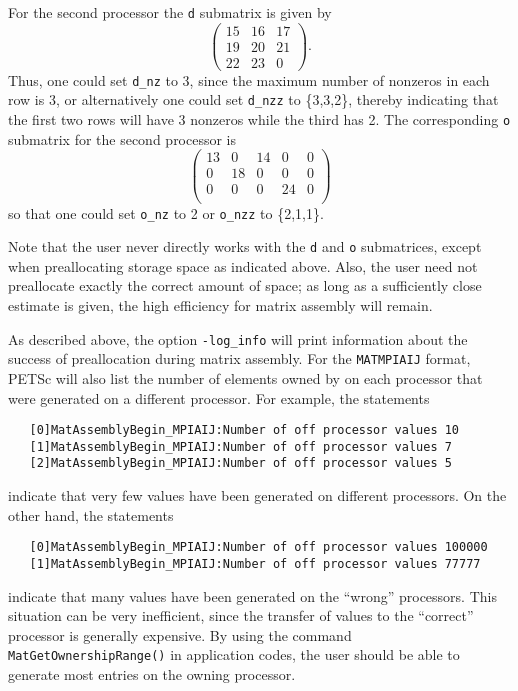 For the second processor the {\tt d} submatrix is given by 
{\small
\[
\left( \begin{array}{cccccccccc} 
 15 & 16 & 17 \\
 19 & 20 & 21 \\
 22 & 23 & 0  
\end{array} \right) .
\]
}
Thus, one could set {\tt d\_nz} to 3, since the maximum number of
nonzeros in each row is 3, or alternatively one could set {\tt d\_nzz} to
\{3,3,2\}, thereby indicating that the first two rows will have 3
nonzeros while the third has 2. The corresponding {\tt o} submatrix for the
second processor is
{\small
\[
\left( \begin{array}{cccccccccc} 
13 & 0  & 14 &  0  & 0  \\
0  & 18 & 0  &  0  & 0 \\
0  & 0  & 0  &  24 & 0 \\
\end{array} \right)
\]
}
so that one could set {\tt o\_nz} to 2 or {\tt o\_nzz} to \{2,1,1\}.

Note that the user never directly works with the {\tt d} and {\tt o}
submatrices, except when preallocating storage space as indicated above.
Also, the user need not preallocate exactly the correct amount of
space; as long as a sufficiently close estimate is given, the high
efficiency for matrix assembly will remain.  

As described above, the option {\tt -log\_info} 
will print information about the success of preallocation during
matrix assembly.  For the {\tt MATMPIAIJ} format, PETSc will also list
the number of elements owned by on each processor that were generated
on a different processor.  For example, the statements
\begin{verbatim}
   [0]MatAssemblyBegin_MPIAIJ:Number of off processor values 10
   [1]MatAssemblyBegin_MPIAIJ:Number of off processor values 7
   [2]MatAssemblyBegin_MPIAIJ:Number of off processor values 5
\end{verbatim}
indicate that very few values have been generated on different processors.
On the other hand, the statements
\begin{verbatim}
   [0]MatAssemblyBegin_MPIAIJ:Number of off processor values 100000
   [1]MatAssemblyBegin_MPIAIJ:Number of off processor values 77777
\end{verbatim}
indicate that many values have been generated on the ``wrong'' processors.
This situation can be very inefficient, since the transfer of values
to the ``correct'' processor is generally expensive.  By using the command
{\tt MatGetOwnershipRange()} in application codes, the user should be able
to generate most entries on the owning processor.

